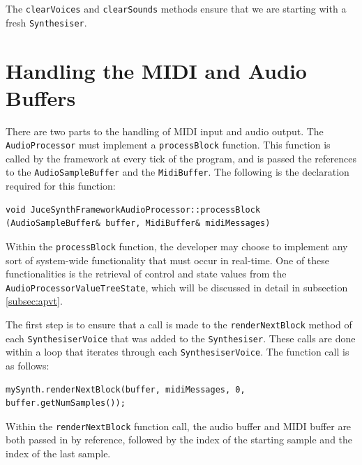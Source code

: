 \documentclass[a4paper,12pt]{report}
\begin{document}
The \texttt{clear\-Voices} and \texttt{clear\-Sounds} methods ensure that we are starting with a fresh \texttt{Synthesiser}.

\section{Handling the MIDI and Audio Buffers}
\label{sec:handlingbuffers}
There are two parts to the handling of MIDI input and audio output. The \texttt{Audio\-Processor} must implement a \texttt{process\-Block} function. This function is called by the framework at every tick of the program, and is passed the references to the \texttt{Audio\-Sample\-Buffer} and the \texttt{Midi\-Buffer}. The following is the declaration required for this function:

 \noindent\begin{minipage}{\linewidth} \begin{lstlisting}[caption={processBlock Declaration},label={code:processblockdeclaration},captionpos=b]
void JuceSynthFrameworkAudioProcessor::processBlock (AudioSampleBuffer& buffer, MidiBuffer& midiMessages)
\end{lstlisting} \end{minipage}

Within the \texttt{process\-Block} function, the developer may choose to implement any sort of system-wide functionality that must occur in real-time. One of these functionalities is the retrieval of control and state values from the \texttt{Audio\-Processor\-Value\-Tree\-State}, which will be discussed in detail in subsection \ref{subsec:apvt}.

The first step is to ensure that a call is made to the \texttt{render\-Next\-Block} method of each \texttt{Synthesiser\-Voice} that was added to the \texttt{Synthesiser}. These calls are done within a loop that iterates through each \texttt{Synthesiser\-Voice}. The function call is as follows: 

 \noindent\begin{minipage}{\linewidth} \begin{lstlisting}[caption={renderNextBlock Function Call},label={code:rendernextblockfunccall},captionpos=b]
mySynth.renderNextBlock(buffer, midiMessages, 0, buffer.getNumSamples());
\end{lstlisting} \end{minipage}

Within the \texttt{renderNextBlock} function call, the audio buffer and MIDI buffer are both passed in by reference, followed by the index of the starting sample and the index of the last sample.
\end{document}
